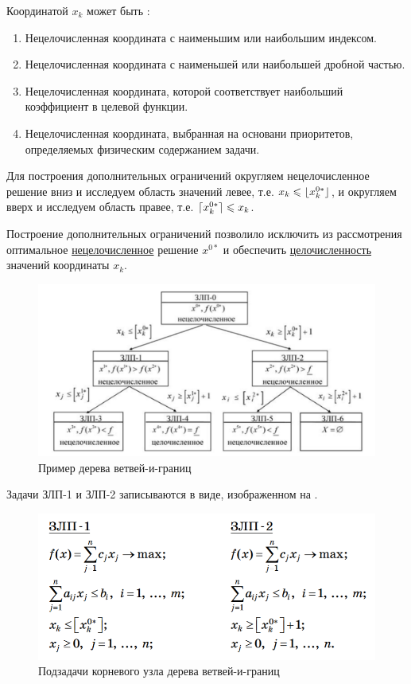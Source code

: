 \documentclass[%
	11pt,
	a4paper,
	utf8,
		]{article}
\begin{document}
Координатой $ x_k $ может быть \cite[]{panteleev}:
\begin{enumerate}
	\item Нецелочисленная координата с наименьшим или наибольшим индексом.
	
	\item Нецелочисленная координата с наименьшей или наибольшей дробной частью.
	
	\item Нецелочисленная координата, которой соответствует наибольший коэффициент в целевой функции.
	
	\item Нецелочисленная координата, выбранная на основани приоритетов, определяемых физическим содержанием задачи.
\end{enumerate}

Для построения дополнительных ограничений округляем нецелочисленное решение вниз и исследуем область значений левее, т.е. $ x_k \leqslant \lfloor x_k^{0*}\rfloor $, и округляем вверх и исследуем область правее, т.е. $ \lceil x_k^{0*}\rceil \leqslant x_k $.

Построение дополнительных ограничений позволило исключить из рассмотрения оптимальное \underline{нецелочисленное} решение $ x^{0*} $ и обеспечить \underline{целочисленность} значений координаты $ x_k $.

\begin{figure}[h]
	\centering
	\includegraphics[scale=0.7]{figures/bb_tree.png}
	\caption{ Пример дерева ветвей-и-границ }\label{fig:bb_tree}
\end{figure}

Задачи ЗЛП-1 и ЗЛП-2 записываются в виде, изображенном на .

\begin{figure}[h]
	\centering
	\includegraphics[scale=0.6]{figures/zlp_1_and_zlp_2.png}
	\caption{ Подзадачи корневого узла дерева ветвей-и-границ }\label{fig:zlp_1_and_zlp_2}
\end{figure}
\end{document}
